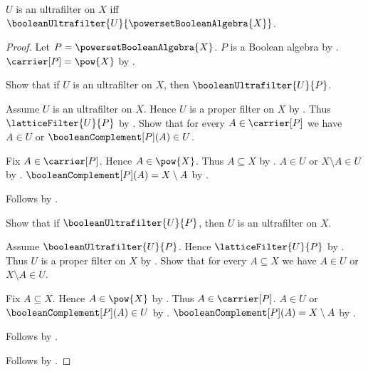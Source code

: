 \begin{theorem}\label{ultrafilter_iff_boolean_ultrafilter_on_powerset_boolean_algebra}
    $U$ is an ultrafilter on $X$ iff
        $\booleanUltrafilter{U}{\powersetBooleanAlgebra{X}}$.
\end{theorem}
\begin{proof}
    Let $P=\powersetBooleanAlgebra{X}$.
    $P$ is a Boolean algebra by
        .
    $\carrier[P]=\pow{X}$ by
        .

    Show that if $U$ is an ultrafilter on $X$, then
        $\booleanUltrafilter{U}{P}$.
    \begin{subproof}
        Assume $U$ is an ultrafilter on $X$.
        Hence $U$ is a proper filter on $X$ by
            .
        Thus $\latticeFilter{U}{P}$ by
            .
        Show that for every $A\in\carrier[P]$ we have
            $A\in U$ or $\booleanComplement[P](A)\in U$.
        \begin{subproof}
            Fix $A\in\carrier[P]$.
            Hence $A\in\pow{X}$.
            Thus $A\subseteq X$ by .
            $A\in U$ or $X\setminus A\in U$ by
                .
            $\booleanComplement[P](A)=X\setminus A$ by
                .
        \end{subproof}
        Follows by
            .
    \end{subproof}

    Show that if $\booleanUltrafilter{U}{P}$, then
        $U$ is an ultrafilter on $X$.
    \begin{subproof}
        Assume $\booleanUltrafilter{U}{P}$.
        Hence $\latticeFilter{U}{P}$ by
            .
        Thus $U$ is a proper filter on $X$ by
            .
        Show that for every $A\subseteq X$ we have
            $A\in U$ or $X\setminus A\in U$.
        \begin{subproof}
            Fix $A\subseteq X$.
            Hence $A\in\pow{X}$ by .
            Thus $A\in\carrier[P]$.
            $A\in U$ or $\booleanComplement[P](A)\in U$ by
                .
            $\booleanComplement[P](A)=X\setminus A$ by
                .
        \end{subproof}
        Follows by .
    \end{subproof}
    Follows by \auto.
\end{proof}
